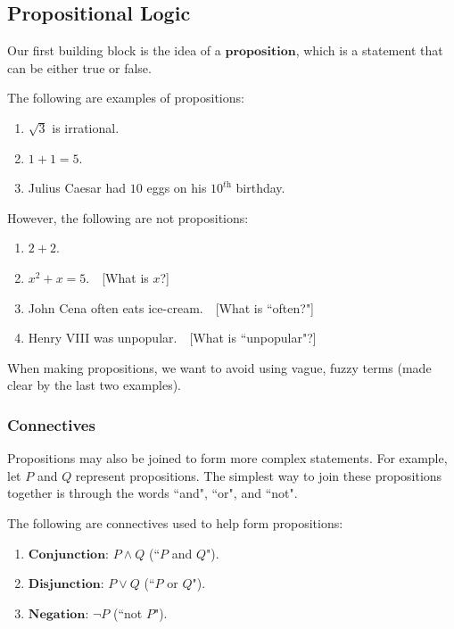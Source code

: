 \documentclass[openany]{book}
\begin{document}
\subsection{Propositional Logic}
\begin{defn}[Proposition]
	Our first building block is the idea of a $\textbf{proposition}$, which is a statement that can be either true or false.
\end{defn}

\begin{example}
	The following are examples of propositions:
	\begin{enumerate}
		\item $\sqrt{3}$ is irrational.
		\item $1+1=5$.
		\item Julius Caesar had $10$ eggs on his $10^{\textit{th}}$ birthday.
	\end{enumerate}
\end{example}

However, the following are not propositions:
\begin{enumerate}
	\item $2+2$.
	\item $x^2+x=5.\quad$[What is $x$?]
	\item John Cena often eats ice-cream.$\quad$[What is ``often?"]
	\item Henry VIII was unpopular.$\quad$[What is ``unpopular"?]
\end{enumerate}

When making propositions, we want to avoid using vague, fuzzy terms (made clear by the last two examples).

\subsubsection{Connectives}
Propositions may also be joined to form more complex statements. For example, let $P$ and $Q$ represent propositions. The simplest way to join these propositions together is through the words ``and", ``or", and ``not".

\begin{defn}[Connectives]
	The following are connectives used to help form propositions:
	\begin{enumerate}
		\item $\textbf{Conjunction}$: $P\land Q$ (``$P$ and $Q$").
		\item $\textbf{Disjunction}$: $P\lor Q$ (``$P$ or $Q$").
		\item $\textbf{Negation}$: $\neg P$ (``not $P$").
	\end{enumerate}
\end{defn}
\end{document}
